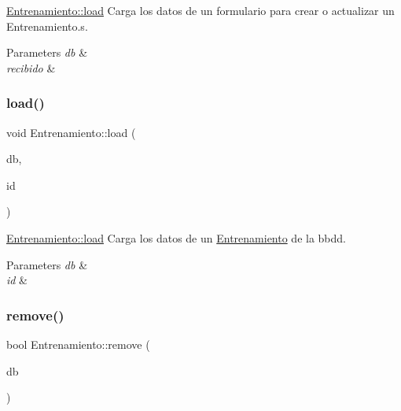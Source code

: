 \mbox{\hyperlink{classEntrenamiento_a5123ff9d743058d3c939b56926200f11}{Entrenamiento\+::load}} Carga los datos de un formulario para crear o actualizar un Entrenamiento.\+s. 


\begin{DoxyParams}{Parameters}
{\em db} & \\
\hline
{\em recibido} & \\
\hline
\end{DoxyParams}
\mbox{\label{classEntrenamiento_a61ef0379c2793e1562b90597f6c37888}} 
\subsubsection{\texorpdfstring{load()}{load()}\hspace{0.1cm}{\footnotesize\ttfamily [2/2]}}
{\footnotesize\ttfamily void Entrenamiento\+::load (\begin{DoxyParamCaption}\item[{Q\+Sql\+Database}]{db,  }\item[{int}]{id }\end{DoxyParamCaption})}



\mbox{\hyperlink{classEntrenamiento_a5123ff9d743058d3c939b56926200f11}{Entrenamiento\+::load}} Carga los datos de un \mbox{\hyperlink{classEntrenamiento}{Entrenamiento}} de la bbdd. 


\begin{DoxyParams}{Parameters}
{\em db} & \\
\hline
{\em id} & \\
\hline
\end{DoxyParams}
\mbox{\label{classEntrenamiento_adedf18d9eef76aab0c4d6325de2ff175}} 
\subsubsection{\texorpdfstring{remove()}{remove()}}
{\footnotesize\ttfamily bool Entrenamiento\+::remove (\begin{DoxyParamCaption}\item[{Q\+Sql\+Database}]{db }\end{DoxyParamCaption})}



